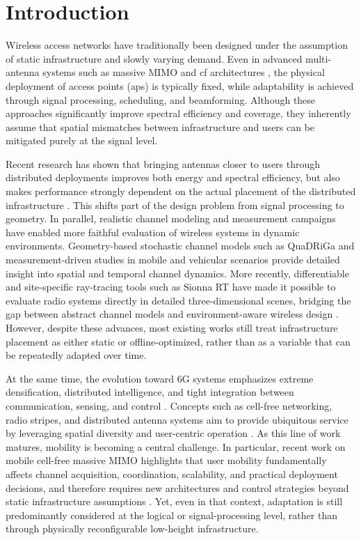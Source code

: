 \section{Introduction}

Wireless access networks have traditionally been designed under the assumption of static infrastructure and slowly varying demand. Even in advanced multi-antenna systems such as massive MIMO \cite{fundamentalsmimo,mimofornextgen} and \gls{cf} architectures \cite{Interdonato_Bjornson_Quoc_Ngo_Frenger_Larsson_2019,cellfreemimobook}, the physical deployment of access points (\glspl{ap}) is typically fixed, while adaptability is achieved through signal processing, scheduling, and beamforming. Although these approaches significantly improve spectral efficiency and coverage, they inherently assume that spatial mismatches between infrastructure and users can be mitigated purely at the signal level.

Recent research has shown that bringing antennas closer to users through distributed deployments improves both energy and spectral efficiency, but also makes performance strongly dependent on the actual placement of the distributed infrastructure \cite{9645048,loschenbrand_towards_2022,zhu2022applacement}. This shifts part of the design problem from signal processing to geometry. In parallel, realistic channel modeling and measurement campaigns have enabled more faithful evaluation of wireless systems in dynamic environments. Geometry-based stochastic channel models such as QuaDRiGa \cite{6758357} and measurement-driven studies in mobile and vehicular scenarios \cite{6981979,8809274,8963325} provide detailed insight into spatial and temporal channel dynamics. More recently, differentiable and site-specific ray-tracing tools such as Sionna RT have made it possible to evaluate radio systems directly in detailed three-dimensional scenes, bridging the gap between abstract channel models and environment-aware wireless design \cite{sionna_rt_2023}. However, despite these advances, most existing works still treat infrastructure placement as either static or offline-optimized, rather than as a variable that can be repeatedly adapted over time.

At the same time, the evolution toward 6G systems emphasizes extreme densification, distributed intelligence, and tight integration between communication, sensing, and control \cite{8869705,9390169,9397776}. Concepts such as cell-free networking, radio stripes, and distributed antenna systems aim to provide ubiquitous service by leveraging spatial diversity and user-centric operation \cite{9145164,Forenza_Perlman_2015}. As this line of work matures, mobility is becoming a central challenge. In particular, recent work on mobile cell-free massive MIMO highlights that user mobility fundamentally affects channel acquisition, coordination, scalability, and practical deployment decisions, and therefore requires new architectures and control strategies beyond static infrastructure assumptions \cite{zheng2024mobilecfmimo}. Yet, even in that context, adaptation is still predominantly considered at the logical or signal-processing level, rather than through physically reconfigurable low-height infrastructure.

